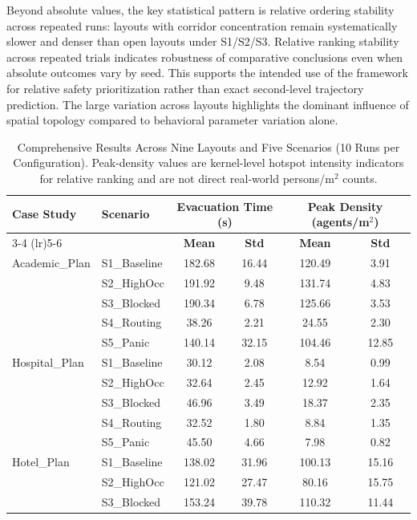 \documentclass[journal]{IEEEtran}
\begin{document}
Beyond absolute values, the key statistical pattern is relative ordering stability across repeated runs: layouts with corridor concentration remain systematically slower and denser than open layouts under S1/S2/S3. Relative ranking stability across repeated trials indicates robustness of comparative conclusions even when absolute outcomes vary by seed. This supports the intended use of the framework for relative safety prioritization rather than exact second-level trajectory prediction.
The large variation across layouts highlights the dominant influence of spatial topology compared to behavioral parameter variation alone.

\begin{table}[t]
\centering
\caption{Comprehensive Results Across Nine Layouts and Five Scenarios (10 Runs per Configuration). Peak-density values are kernel-level hotspot intensity indicators for relative ranking and are not direct real-world persons/m$^2$ counts.}
\label{tab:results_main}
\begin{tabular}{llcccc}
\toprule
\textbf{Case Study} & \textbf{Scenario} & \multicolumn{2}{c}{\textbf{Evacuation Time (s)}} & \multicolumn{2}{c}{\textbf{Peak Density (agents/m$^2$)}} \\
\cmidrule(lr){3-4} \cmidrule(lr){5-6}
& & \textbf{Mean} & \textbf{Std} & \textbf{Mean} & \textbf{Std} \\
\midrule
Academic\_Plan & S1\_Baseline & 182.68 & 16.44 & 120.49 & 3.91 \\
 & S2\_HighOcc & 191.92 & 9.48 & 131.74 & 4.83 \\
 & S3\_Blocked & 190.34 & 6.78 & 125.66 & 3.53 \\
 & S4\_Routing & 38.26 & 2.21 & 24.55 & 2.30 \\
 & S5\_Panic & 140.14 & 32.15 & 104.46 & 12.85 \\
\midrule
Hospital\_Plan & S1\_Baseline & 30.12 & 2.08 & 8.54 & 0.99 \\
 & S2\_HighOcc & 32.64 & 2.45 & 12.92 & 1.64 \\
 & S3\_Blocked & 46.96 & 3.49 & 18.37 & 2.35 \\
 & S4\_Routing & 32.52 & 1.80 & 8.84 & 1.35 \\
 & S5\_Panic & 45.50 & 4.66 & 7.98 & 0.82 \\
\midrule
Hotel\_Plan & S1\_Baseline & 138.02 & 31.96 & 100.13 & 15.16 \\
 & S2\_HighOcc & 121.02 & 27.47 & 80.16 & 15.75 \\
 & S3\_Blocked & 153.24 & 39.78 & 110.32 & 11.44 \\

\end{tabular}
\end{table}
\end{document}
